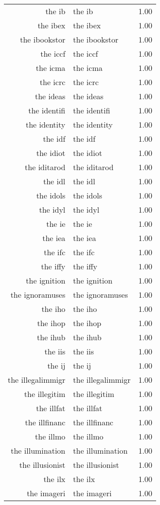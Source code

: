 \begin{table}[ht]
\begin{tabular}{rlr}
  the ib & the ib & 1.00 \\ 
  the ibex & the ibex & 1.00 \\ 
  the ibookstor & the ibookstor & 1.00 \\ 
  the iccf & the iccf & 1.00 \\ 
  the icma & the icma & 1.00 \\ 
  the icrc & the icrc & 1.00 \\ 
  the ideas & the ideas & 1.00 \\ 
  the identifi & the identifi & 1.00 \\ 
  the identity & the identity & 1.00 \\ 
  the idf & the idf & 1.00 \\ 
  the idiot & the idiot & 1.00 \\ 
  the iditarod & the iditarod & 1.00 \\ 
  the idl & the idl & 1.00 \\ 
  the idols & the idols & 1.00 \\ 
  the idyl & the idyl & 1.00 \\ 
  the ie & the ie & 1.00 \\ 
  the iea & the iea & 1.00 \\ 
  the ifc & the ifc & 1.00 \\ 
  the iffy & the iffy & 1.00 \\ 
  the ignition & the ignition & 1.00 \\ 
  the ignoramuses & the ignoramuses & 1.00 \\ 
  the iho & the iho & 1.00 \\ 
  the ihop & the ihop & 1.00 \\ 
  the ihub & the ihub & 1.00 \\ 
  the iis & the iis & 1.00 \\ 
  the ij & the ij & 1.00 \\ 
  the illegalimmigr & the illegalimmigr & 1.00 \\ 
  the illegitim & the illegitim & 1.00 \\ 
  the illfat & the illfat & 1.00 \\ 
  the illfinanc & the illfinanc & 1.00 \\ 
  the illmo & the illmo & 1.00 \\ 
  the illumination & the illumination & 1.00 \\ 
  the illusionist & the illusionist & 1.00 \\ 
  the ilx & the ilx & 1.00 \\ 
  the imageri & the imageri & 1.00 \\ 

\end{tabular}
\end{table}
